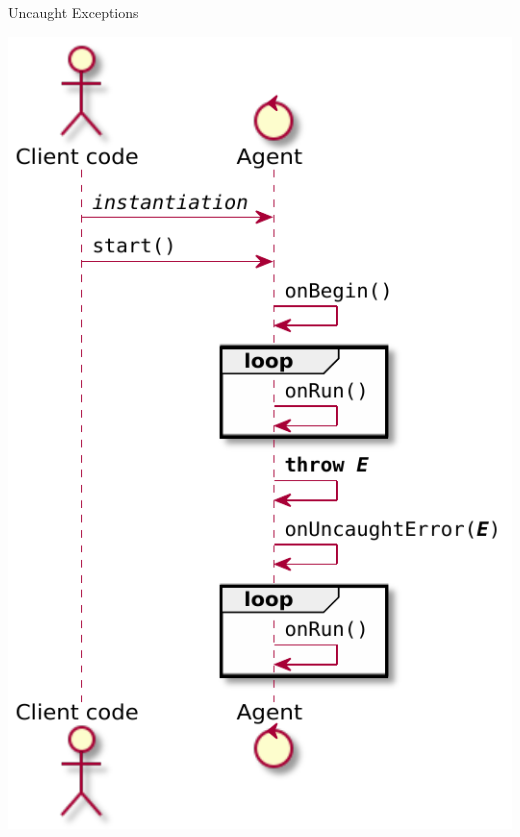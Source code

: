 \documentclass[presentation]{beamer}\mode<presentation>{\usetheme{AMSCesenaPurpleAndGold}}
\begin{document}
\begin{frame}[allowframebreaks]{Uncaught Exceptions}
    \begin{center}
    	\includegraphics[height=.8\textheight]{img/exceptional-flow-1.pdf}
    \end{center}
    

\end{frame}
\end{document}
